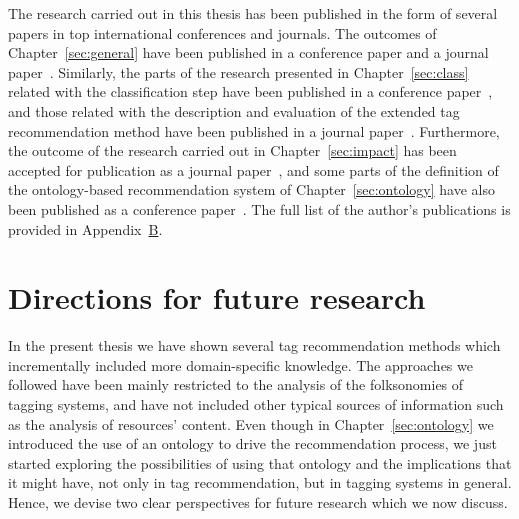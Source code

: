 The research carried out in this thesis has been published in the form of several papers in top international conferences and journals. The outcomes of Chapter~\ref{sec:general} have been published in a conference paper and a journal paper~\citep{Font2012,Font2013}.
Similarly, the parts of the research presented in Chapter~\ref{sec:class} related with the classification step have been published in a conference paper~\citep{Font2013a}, and those related with the description and evaluation of the extended tag recommendation method have been published in a journal paper~\citep{Font2014}. 
Furthermore, the outcome of the research carried out in Chapter~\ref{sec:impact} has been accepted for publication as a journal paper~\citep{Font2015}, and some parts of the definition of the ontology-based recommendation system of Chapter~\ref{sec:ontology} have also been published as a conference paper~\citep{Font2014a}.
The full list of the author’s publications is provided in Appendix~\hyperref[sec:Pubs]{B}.


\section{Directions for future research}
\label{sec:conclusion:future}

In the present thesis we have shown several tag recommendation methods which incrementally included more domain-specific knowledge. The approaches we followed have been mainly restricted to the analysis of the folksonomies of tagging systems, and have not included other typical sources of information such as the analysis of resources' content. 
Even though in Chapter~\ref{sec:ontology} we introduced the use of an ontology to drive the recommendation process, we just started exploring the possibilities of using that ontology and the implications that it might have, not only in tag recommendation, but in tagging systems in general. 
Hence, we devise two clear perspectives for future research which we now discuss.

